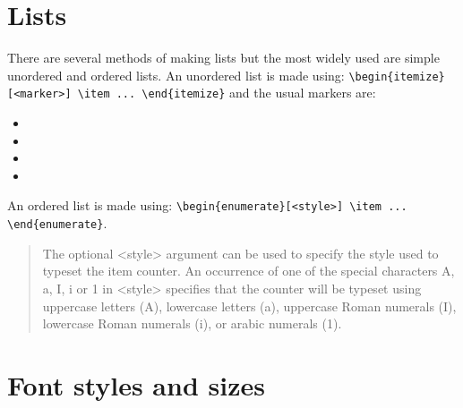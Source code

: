 \section{Lists}

There are several methods of making lists but the most widely used are simple unordered and ordered lists.
An unordered list is made using:
\verb?\begin{itemize}[<marker>] \item ... \end{itemize}?
and the usual markers are:
\begin{itemize}
  \item {} \textbullet
  \item {} \textendash
  \item {} \textasteriskcentered
  \item {} \textperiodcentered
\end{itemize}  
An ordered list is made using:
\verb?\begin{enumerate}[<style>] \item ... \end{enumerate}?.
\begin{quotation}
The
optional <style> argument can be used to specify the style used to typeset the item counter.
An occurrence of one of the special characters A, a, I, i or 1 in <style> specifies that the
counter will be typeset using uppercase letters (A), lowercase letters (a), uppercase Roman
numerals (I), lowercase Roman numerals (i), or arabic numerals (1).
\end{quotation}

\section{Font styles and sizes}

